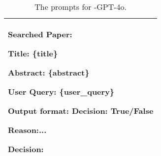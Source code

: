 \begin{table*}[h]
{\begin{tabular}{p{19cm}}
Searched Paper:

Title: \{title\}

Abstract: \{abstract\}

User Query: \{user\_query\}

Output format: Decision: True/False

Reason:... 

Decision:\\
\bottomrule[1pt]
\end{tabular}
}
\caption{The prompts for \pasa-GPT-4o.}
\label{prompt_pasa_gpt4o}
\end{table*}


